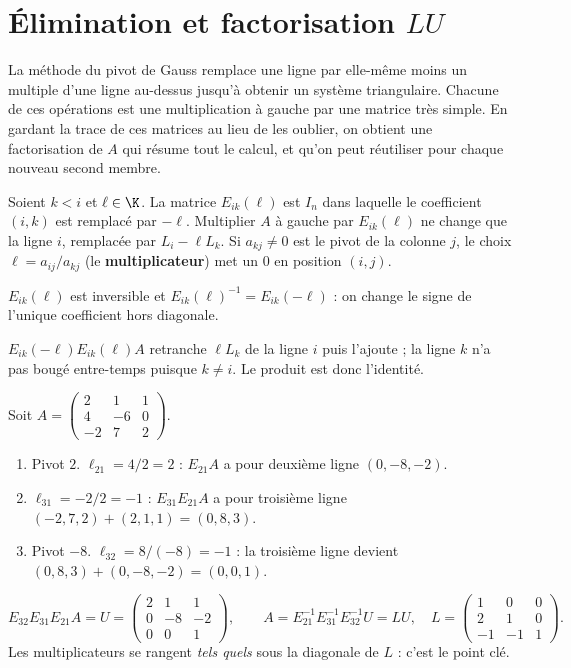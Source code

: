 \section{Élimination et factorisation $LU$}
\begin{intuition}
La méthode du pivot de Gauss remplace une ligne par \og elle-même moins un multiple d'une ligne au-dessus \fg{} jusqu'à obtenir un système triangulaire. Chacune de ces opérations est une multiplication à gauche par une matrice très simple. En gardant la trace de ces matrices au lieu de les oublier, on obtient une factorisation de $A$ qui résume tout le calcul, et qu'on peut réutiliser pour chaque nouveau second membre.
\end{intuition}
\begin{definition}
Soient $k<i$ et $\ell\in\K$. La matrice $E_{ik}(\ell)$ est $I_n$ dans laquelle le coefficient $(i,k)$ est remplacé par $-\ell$. Multiplier $A$ à gauche par $E_{ik}(\ell)$ ne change que la ligne $i$, remplacée par $L_i-\ell L_k$. Si $a_{kj}\neq0$ est le pivot de la colonne $j$, le choix $\ell=a_{ij}/a_{kj}$ (le \textbf{multiplicateur}) met un $0$ en position $(i,j)$.
\end{definition}
\begin{proposition}\label{prop-elim-inverse}
$E_{ik}(\ell)$ est inversible et $E_{ik}(\ell)^{-1}=E_{ik}(-\ell)$ : on change le signe de l'unique coefficient hors diagonale.
\end{proposition}
\begin{preuve}
$E_{ik}(-\ell)E_{ik}(\ell)A$ retranche $\ell L_k$ de la ligne $i$ puis l'ajoute ; la ligne $k$ n'a pas bougé entre-temps puisque $k\neq i$. Le produit est donc l'identité.
\end{preuve}
\begin{exemple}\label{ex-fil-rouge}
Soit $A=\begin{pmatrix}2&1&1\\4&-6&0\\-2&7&2\end{pmatrix}$.
\begin{enumerate}
\item Pivot $2$. $\ell_{21}=4/2=2$ : $E_{21}A$ a pour deuxième ligne $(0,-8,-2)$.
\item $\ell_{31}=-2/2=-1$ : $E_{31}E_{21}A$ a pour troisième ligne $(-2,7,2)+(2,1,1)=(0,8,3)$.
\item Pivot $-8$. $\ell_{32}=8/(-8)=-1$ : la troisième ligne devient $(0,8,3)+(0,-8,-2)=(0,0,1)$.
\end{enumerate}
\[E_{32}E_{31}E_{21}A=U=\begin{pmatrix}2&1&1\\0&-8&-2\\0&0&1\end{pmatrix},\qquad A=E_{21}^{-1}E_{31}^{-1}E_{32}^{-1}U=LU,\quad L=\begin{pmatrix}1&0&0\\2&1&0\\-1&-1&1\end{pmatrix}.\]
Les multiplicateurs se rangent \emph{tels quels} sous la diagonale de $L$ : c'est le point clé.
\end{exemple}
